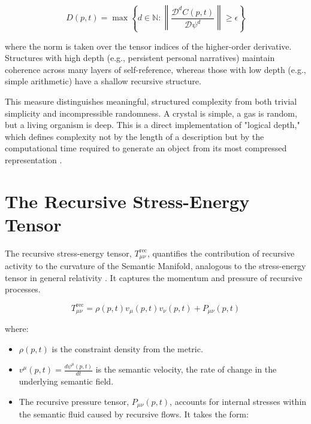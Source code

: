 \begin{equation}
D(p, t) = \max \left\{ d \in \mathbb{N} : \left\| \frac{\mathcal{D}^d C(p,t)}{\mathcal{D} \psi^d} \right\| \geq \epsilon \right\}
\end{equation}

where the norm is taken over the tensor indices of the higher-order derivative. Structures with high depth (e.g., persistent personal narratives) maintain coherence across many layers of self-reference, whereas those with low depth (e.g., simple arithmetic) have a shallow recursive structure.

This measure distinguishes meaningful, structured complexity from both trivial simplicity and incompressible randomness. A crystal is simple, a gas is random, but a living organism is deep. This is a direct implementation of "logical depth," which defines complexity not by the length of a description but by the computational time required to generate an object from its most compressed representation \autocite{Bennett1988}.


\section{The Recursive Stress-Energy Tensor}
\label{4.4:the_recursive_stress_energy_tensor}

The recursive stress-energy tensor, \(T_{\mu\nu}^{\text{rec}}\), quantifies the contribution of recursive activity to the curvature of the Semantic Manifold, analogous to the stress-energy tensor in general relativity \autocite{Einstein1915}. It captures the momentum and pressure of recursive processes.

\begin{equation}
T_{\mu\nu}^{\text{rec}} = \rho(p,t) v_\mu(p,t) v_\nu(p,t) + P_{\mu\nu}(p,t)
\end{equation}

where:

\begin{itemize}

    \item \(\rho(p,t)\) is the constraint density from the metric.
    
    \item \(v^\mu(p,t) = \frac{d\psi^\mu(p,t)}{dt}\) is the semantic velocity, the rate of change in the underlying semantic field.
    
    \item The recursive pressure tensor, \(P_{\mu\nu}(p,t)\), accounts for internal stresses within the semantic fluid caused by recursive flows. It takes the form:
    
\end{itemize}


